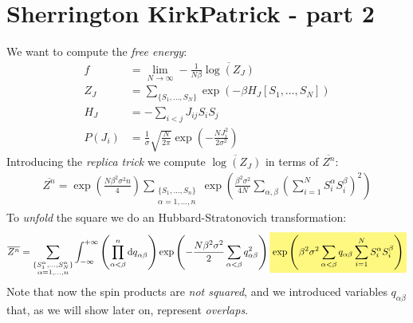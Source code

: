 \documentclass[../template.tex]{subfiles}
\begin{document}

\section{Sherrington KirkPatrick - part 2}
We want to compute the \textit{free energy}:
\begin{align*}
    f &= \lim_{N \to \infty} -\frac{1}{N \beta} \overline{\log (Z_J)} \\
    Z_J &= \sum_{\{S_1, \dots, S_N\}} \exp(-\beta H_J[S_1, \dots, S_N]) \\
    H_J&= - \sum_{i < j} J_{ij} S_i S_j\\
    P(J_i) &= \frac{1}{\sigma} \sqrt{\frac{N}{2 \pi} }\exp\left(-\frac{N J_i^2}{2 \sigma^2} \right) 
\end{align*} 
Introducing the \textit{replica trick} we compute $\overline{\log(Z_J)}$ in terms of $\overline{Z^n}$:
\begin{align*}
    \overline{Z^n} = \exp\left(\frac{N \beta^2 \sigma^2 n}{4} \right) \sum_{\substack{\{S_1,\dots,S_n\}\\ \alpha = 1,\dots,n}} \exp\left(\frac{\beta^2 \sigma^2}{4N} \sum_{\alpha, \beta} \left(\sum_{i=1}^N S_i^\alpha S_i^\beta\right)^2\right)
\end{align*}   
To \textit{unfold} the square we do an Hubbard-Stratonovich transformation:
\begin{align}
    \overline{Z^n} = \sum_{\substack{\{S_1^\alpha, \dots, S_N^\alpha\}\\ \alpha =1,\dots,n}}\int_{-\infty}^{+\infty} \left(\prod_{\alpha < \beta}^n \dd{q}_{\alpha \beta}\right) \exp\left(-\frac{N \beta^2 \sigma^2}{2} \sum_{\alpha < \beta} q^2_{\alpha \beta}\right) \hlc{Yellow}{\exp\left(\beta^2 \sigma^2 \sum_{\alpha < \beta} q_{\alpha \beta} \sum_{i=1}^N S_i^\alpha S_i^\beta\right)}
    \label{eqn:Zn}
\end{align}
Note that now the spin products are \textit{not squared}, and we introduced variables $q_{\alpha \beta}$ that, as we will show later on, represent \textit{overlaps}.
\end{document}
